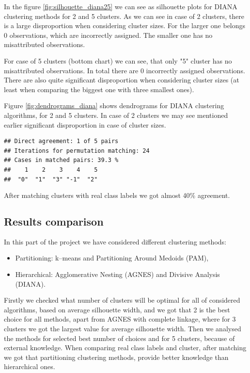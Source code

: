 \documentclass[11pt,a4paper]{article}\usepackage[]{graphicx}\usepackage[]{xcolor}
\makeatletter
\newenvironment{kframe}{%
 \def\at@end@of@kframe{}%
 \ifinner\ifhmode%
  \def\at@end@of@kframe{\end{minipage}}%
  \begin{minipage}{\columnwidth}%
 \fi\fi%
 \def\FrameCommand##1{\hskip\@totalleftmargin \hskip-\fboxsep
 \colorbox{shadecolor}{##1}\hskip-\fboxsep
     \hskip-\linewidth \hskip-\@totalleftmargin \hskip\columnwidth}%
 \MakeFramed {\advance\hsize-\width
   \@totalleftmargin\z@ \linewidth\hsize
   \@setminipage}}%
 {\par\unskip\endMakeFramed%
 \at@end@of@kframe}
\newenvironment{knitrout}{}{} %
\makeatother
\begin{document}
	In the figure \ref{fig:silhouette_diana25} we can see as silhouette plots for DIANA clustering methods for 2 and 5 clusters. As we can see in case of 2 clusters, there is a large disproportion when considering cluster sizes. For the larger one belongs 0 observations, which are incorrectly assigned. The smaller one has no misattributed observations.
	
	For case of 5 clusters (bottom chart) we can see, that only "5" cluster has no misattributed observations. In total there are 0 incorrectly assigned observations. There are also quite significant disproportion when considering cluster sizes (at least when comparing the biggest one with three smallest ones).
	
	Figure \ref{fig:dendrograms_diana} shows dendrograms for DIANA clustering algorithms, for 2 and 5 clusters. In case of 2 clusters we may see mentioned earlier significant disproportion in case of cluster sizes.
	
\begin{knitrout}
\color{fgcolor}\begin{kframe}
\begin{verbatim}
## Direct agreement: 1 of 5 pairs
## Iterations for permutation matching: 24 
## Cases in matched pairs: 39.3 %
##    1    2    3    4    5 
##  "0"  "1"  "3" "-1"  "2"
\end{verbatim}
\end{kframe}
\end{knitrout}
	
	After matching clusters with real class labels we got almost 40\% agreement.
	
	\subsection{Results comparison}
	
	In this part of the project we have considered different clustering methods:
	\begin{itemize}
		\item Partitioning: k--means and Partitioning Around Medoids (PAM),
		\item Hierarchical: Agglomerative Nesting (AGNES) and Divisive Analysis (DIANA).
	\end{itemize}
	Firstly we checked what number of clusters will be optimal for all of considered algorithms, based on average silhouette width, and we got that 2 is the best choice for all methods, apart from AGNES with complete linkage, where for 3 clusters we got the largest value for average silhouette width. Then we analysed the methods for selected best number of choices and for 5 clusters, because of external knowledge. When comparing real class labels and cluster, after matching we got that partitioning clustering methods, provide better knowledge than hierarchical ones.
	
\end{document}
